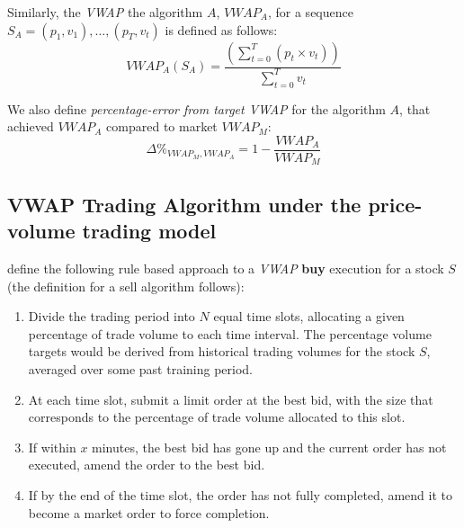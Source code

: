 Similarly, the \textit{VWAP} the algorithm $A$, $VWAP_A$, for a sequence $S_A = (p_1, v_1), \ldots, (p_T, v_t)$ is defined as follows:
\begin{equation}  
\label{Equation/Algo-Vwap}
VWAP_A(S_A) = \frac{\left( \displaystyle\sum\limits_{t=0}^T (p_t \times v_t) \right)}{\displaystyle\sum\limits_{t=0}^T v_t}
\end{equation}

We also define \textit{percentage-error from target VWAP} for the algorithm $A$, that achieved $VWAP_A$ compared to market $VWAP_M$:
\begin{equation}  
\label{Equation/VWAP-Percentage-Error}
\Delta\%_{VWAP_M, VWAP_A} = 1 - \frac{VWAP_A}{VWAP_M}
\end{equation}

\subsection{VWAP Trading Algorithm under the price-volume trading model}
\label{Chapters/Background/Vwap-Algorithm}
\citet{Coggins2006} define the following rule based approach to a \textit{VWAP} \textbf{buy} execution for a stock $S$ (the definition for a sell algorithm follows):
\begin{enumerate}
\item Divide the trading period into $N$ equal time slots, allocating a given percentage of trade volume to each time interval. The percentage volume targets would be derived from historical trading volumes for the stock $S$, averaged over some past training period.
\item At each time slot, submit a limit order at the best bid, with the size that corresponds to the percentage of trade volume allocated to this slot.
\item If within $x$ minutes, the best bid has gone up and the current order has not executed, amend the order to the best bid.
\item If by the end of the time slot, the order has not fully completed, amend it to become a market order to force completion.
\end{enumerate}
